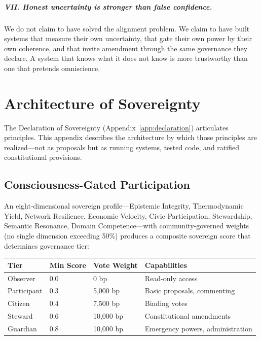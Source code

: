 \documentclass[12pt]{book}
\begin{document}
\paragraph{VII. Honest uncertainty is stronger than false confidence.}
We do not claim to have solved the alignment problem. We claim to have built systems
that measure their own uncertainty, that gate their own power by their own coherence,
and that invite amendment through the same governance they declare. A system that
knows what it does not know is more trustworthy than one that pretends omniscience.


\chapter{Architecture of Sovereignty}
\label{app:architecture-sovereignty}

The Declaration of Sovereignty (Appendix~\ref{app:declaration}) articulates
principles. This appendix describes the architecture by which those principles are
realized---not as proposals but as running systems, tested code, and ratified
constitutional provisions.

\section*{Consciousness-Gated Participation}

An eight-dimensional sovereign profile---Epistemic Integrity, Thermodynamic Yield, Network Resilience, Economic Velocity, Civic Participation, Stewardship, Semantic Resonance, Domain Competence---with community-governed weights (no single dimension exceeding 50\%) produces a composite
sovereign score that determines governance tier:

\begin{table}[H]
\centering
\begin{tabular}{llll}
\toprule
\textbf{Tier} & \textbf{Min Score} & \textbf{Vote Weight} & \textbf{Capabilities} \\
\midrule
Observer    & 0.0 & 0 bp     & Read-only access \\
Participant & 0.3 & 5,000 bp & Basic proposals, commenting \\
Citizen     & 0.4 & 7,500 bp & Binding votes \\
Steward     & 0.6 & 10,000 bp & Constitutional amendments \\
Guardian    & 0.8 & 10,000 bp & Emergency powers, administration \\
\bottomrule
\end{tabular}
\end{table}
\end{document}
